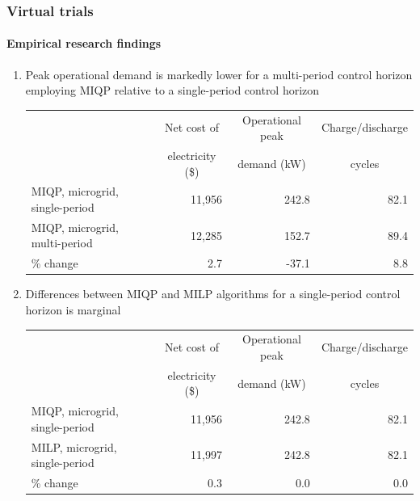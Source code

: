 \documentclass[handout, smaller, xcolor=table]{beamer}			%
\newcounter{enumcount}
\begin{document}
\begin{frame}
	\frametitle{Virtual trials}
	\framesubtitle{Empirical research findings}

	\begin{enumerate}
		\setcounter{enumi}{\value{enumcount}}		
		\item  Peak operational demand is markedly lower for a multi-period control horizon employing MIQP relative to a single-period control horizon
			\begin{table}[!h]
			\centering
			{\scriptsize
			\begin{tabular}{l r r r}
				\toprule
				& \multicolumn{1}{c}{Net cost of}	& \multicolumn{1}{c}{Operational peak}	& \multicolumn{1}{c}{Charge/discharge}	\\
				& \multicolumn{1}{c}{	electricity (\$)} 	& \multicolumn{1}{c}{demand (kW)}		&\multicolumn{1}{c}{cycles}	\\
				\midrule
				MIQP, microgrid, single-period		& 11,956	& 242.8	& 82.1	\\
				MIQP, microgrid, multi-period		& 12,285	& 152.7	& 89.4	\\
				\midrule
				\% change	& 2.7		& -37.1	& 8.8		\\
				\bottomrule
			\end{tabular}
			}
			\end{table}
		
		\item  Differences between MIQP and MILP algorithms for a single-period control horizon is marginal
			\begin{table}
			\centering
			{\scriptsize
			\begin{tabular}{l r r r}
				\toprule
				& \multicolumn{1}{c}{Net cost of}	& \multicolumn{1}{c}{Operational peak}	& \multicolumn{1}{c}{Charge/discharge}	\\
				& \multicolumn{1}{c}{	electricity (\$)} 	& \multicolumn{1}{c}{demand (kW)}		&\multicolumn{1}{c}{cycles}	\\
				\midrule
				MIQP, microgrid, single-period		& 11,956	& 242.8	& 82.1	\\
				MILP, microgrid, single-period		& 11,997	& 242.8	& 82.1	\\
				\midrule
				\% change	& 0.3		& 0.0		& 0.0		\\
				\bottomrule
			\end{tabular}
			}
			\end{table}
		
		\setcounter{enumcount}{\value{enumi}}	
	\end{enumerate}

\end{frame}
\end{document}
